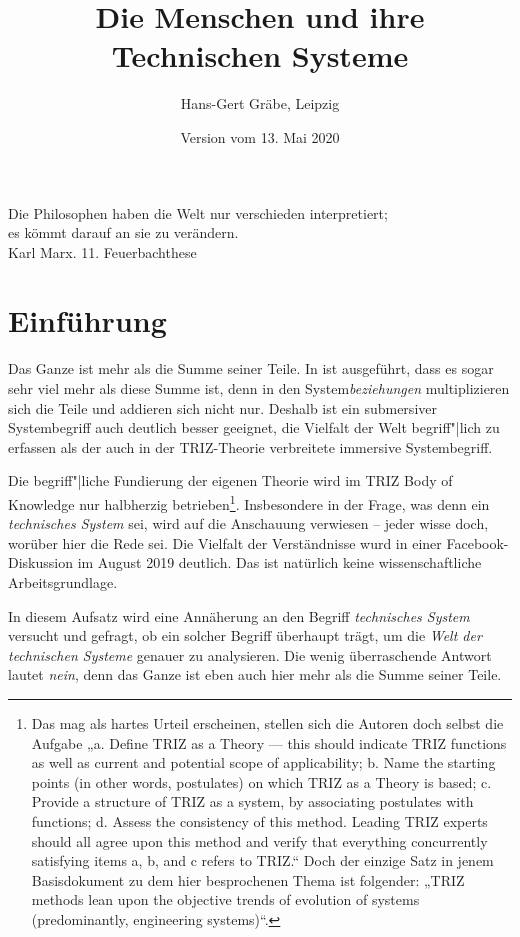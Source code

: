 \documentclass[11pt,a4paper]{article}
\title{Die Menschen und ihre Technischen Systeme}
\author{Hans-Gert Gräbe, Leipzig}
\date{Version vom 13. Mai 2020}
\begin{document}
\maketitle\vfill
\tableofcontents
\pagebreak
\begin{flushright}
  Die Philosophen haben die Welt nur verschieden interpretiert;\\ es kömmt
  darauf an sie zu verändern.\\ Karl Marx. 11. Feuerbachthese
\end{flushright}

\section{Einführung}

Das Ganze ist mehr als die Summe seiner Teile. In \cite{Graebe2020} ist
ausgeführt, dass es sogar sehr viel mehr als diese Summe ist, denn in den
System\emph{beziehungen} multiplizieren sich die Teile und addieren sich nicht
nur.  Deshalb ist ein submersiver Systembegriff auch deutlich besser geeignet,
die Vielfalt der Welt begriff"|lich zu erfassen als der auch in der
TRIZ-Theorie verbreitete immersive Systembegriff.

Die begriff"|liche Fundierung der eigenen Theorie wird im TRIZ Body of
Knowledge \cite{TBK-2007} nur halbherzig betrieben\footnote{Das mag als hartes
  Urteil erscheinen, stellen sich die Autoren doch selbst die Aufgabe „a.
  Define TRIZ as a Theory — this should indicate TRIZ functions as well as
  current and potential scope of applicability; b.  Name the starting points
  (in other words, postulates) on which TRIZ as a Theory is based; c.  Provide
  a structure of TRIZ as a system, by associating postulates with functions;
  d.  Assess the consistency of this method. Leading TRIZ experts should all
  agree upon this method and verify that everything concurrently satisfying
  items a, b, and c refers to TRIZ.“ Doch der einzige Satz in jenem
  Basisdokument zu dem hier besprochenen Thema ist folgender: „TRIZ methods
  lean upon the objective trends of evolution of systems (predominantly,
  engineering systems)“.}. Insbesondere in der Frage, was denn ein
\emph{technisches System} sei, wird auf die Anschauung verwiesen -- jeder
wisse doch, worüber hier die Rede sei. Die Vielfalt der Verständnisse wurd in
einer Facebook-Diskussion \cite{Graebe2019b} im August 2019 deutlich.  Das ist
natürlich keine wissenschaftliche Arbeitsgrundlage.

In diesem Aufsatz wird eine Annäherung an den Begriff \emph{technisches
  System} versucht und gefragt, ob ein solcher Begriff überhaupt trägt, um die
\emph{Welt der technischen Systeme} genauer zu analysieren.  Die wenig
überraschende Antwort lautet \emph{nein}, denn das Ganze ist eben auch hier
mehr als die Summe seiner Teile.
\end{document}
